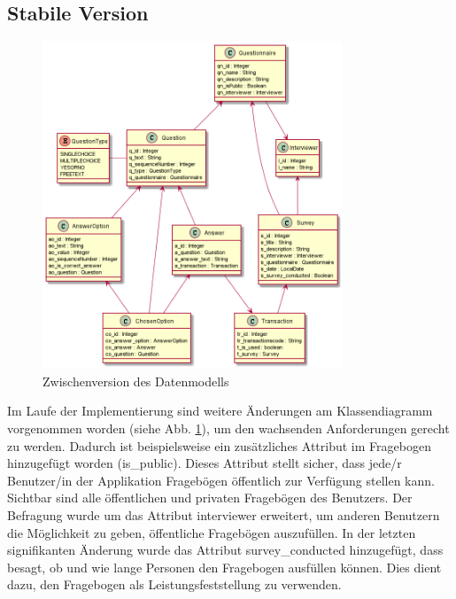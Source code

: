 \subsection{Stabile Version}
\begin{figure}[H]
    \includegraphics[width=0.8\textwidth]{pics/cld_Version3.png}
    \centering
    \caption{Zwischenversion des Datenmodells}
    \label{fig:cld4}
\end{figure}

Im Laufe der Implementierung sind weitere Änderungen am Klassendiagramm vorgenommen worden (siehe Abb. \ref{fig:cld4}), um den 
wachsenden Anforderungen gerecht zu werden. Dadurch ist beispielsweise ein zusätzliches 
Attribut im Fragebogen hinzugefügt worden (is\_public). Dieses Attribut stellt sicher, dass jede/r Benutzer/in der Applikation 
Fragebögen öffentlich zur Verfügung stellen kann. Sichtbar sind alle öffentlichen und privaten Fragebögen des Benutzers. 
\newline
Der Befragung wurde um das Attribut interviewer erweitert, um anderen Benutzern die Möglichkeit zu 
geben, öffentliche Fragebögen auszufüllen.
In der letzten signifikanten Änderung wurde das Attribut survey\_conducted hinzugefügt, 
dass besagt, ob und wie lange Personen den Fragebogen ausfüllen können. Dies dient 
dazu, den Fragebogen als Leistungsfeststellung zu verwenden.

